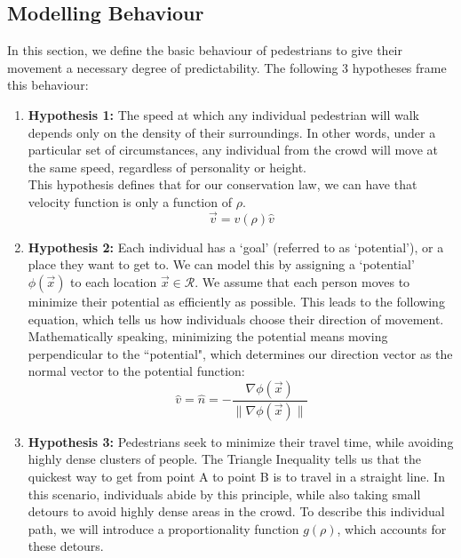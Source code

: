 \documentclass{article}
\begin{document}
\subsection{Modelling Behaviour}
In this section, we define the basic behaviour of pedestrians to give their movement a necessary degree of predictability. The following 3 hypotheses frame this behaviour:
\begin{enumerate}
    \item \textbf{Hypothesis 1:} The speed at which any individual pedestrian will walk depends only on the density of their surroundings. In other words, under a particular set of circumstances, any individual from the crowd will move at the same speed, regardless of personality or height.
    \\
    This hypothesis defines that for our conservation law, we can have that velocity function is only a function of $\rho$.
    \begin{equation}
        \vec{v} = v(\rho) \hat{v}\label{hyp1}
    \end{equation}
    
    
    \item \textbf{Hypothesis 2:} Each individual has a `goal' (referred to as `potential'), or a place they want to get to. We can model this by assigning a `potential' $\phi(\vec x)$ to each location $\vec x \in\mathcal R$. We assume that each person moves to minimize their potential as efficiently as possible. This leads to the following equation,  which tells us how individuals choose their direction of movement.
    \\
    Mathematically speaking, minimizing the potential means moving perpendicular to the ``potential", which determines our direction vector as the normal vector to the potential function:
    \begin{equation}
         \hat{v} = \hat{n} = -\frac{\nabla\phi(\vec x)}{\|\nabla\phi(\vec x)\|}
    \end{equation}
    
    \item \textbf{Hypothesis 3:} Pedestrians seek to minimize their travel time, while avoiding highly dense clusters of people. The Triangle Inequality tells us that the quickest way to get from point A to point B is to travel in a straight line. In this scenario, individuals abide by this principle, while also taking small detours to avoid highly dense areas in the crowd. To describe this individual path, we will introduce a proportionality function $g(\rho)$, which accounts for these detours.
    

\end{enumerate}
\end{document}

